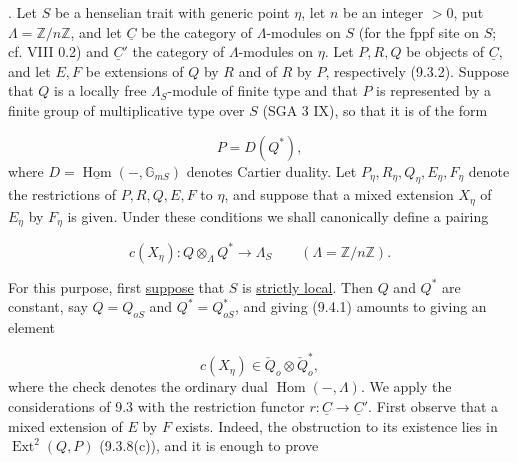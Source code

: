 
\medskip
{}. Let $S$ be a henselian trait with generic point $\eta$, let $n$ be an
integer $>0$, put $\Lambda=\mathbb Z/n\mathbb Z$, and let $\underline C$ be
the category of $\Lambda$-modules on $S$ (for the fppf site on $S$; cf.
VIII 0.2) and $\underline C'$ the category of $\Lambda$-modules on $\eta$.
Let $P,R,Q$ be objects of $\underline C$, and let $E,F$ be extensions of
$Q$ by $R$ and of $R$ by $P$, respectively (9.3.2). Suppose that $Q$ is a
locally free $\Lambda_S$-module of finite type and that $P$ is represented
by a finite group of multiplicative type over $S$ (SGA 3 IX), so that it is
of the form

\begin{equation*}
P=D(Q^*),
\end{equation*}
where $D=\underline{\operatorname{Hom}}(-,\mathbb G_{mS})$ denotes Cartier
duality. Let $P_\eta,R_\eta,Q_\eta,E_\eta,F_\eta$ denote the restrictions of
$P,R,Q,E,F$ to $\eta$, and suppose that a mixed extension $X_\eta$ of
$E_\eta$ by $F_\eta$ is given. Under these conditions we shall canonically
define a pairing

\begin{equation}\tag{9.4.1}
c(X_\eta):Q\otimes_\Lambda Q^*\longrightarrow\Lambda_S
\qquad(\Lambda=\mathbb Z/n\mathbb Z).
\end{equation}

For this purpose, first \underline{suppose} that $S$ is \underline{strictly local}. Then $Q$
and $Q^*$ are constant, say $Q=Q_{oS}$ and $Q^*=Q^*_{oS}$, and giving
(9.4.1) amounts to giving an element

\begin{equation}\tag{9.4.2}
c(X_\eta)\in\check Q_o\otimes\check Q_o^*,
\end{equation}
where the check denotes the ordinary dual $\operatorname{Hom}(-,\Lambda)$.
We apply the considerations of 9.3 with the restriction functor
$r:\underline C\longrightarrow\underline C'$. First observe that a mixed
extension of $E$ by $F$ exists. Indeed, the obstruction to its existence
lies in $\operatorname{Ext}^2(Q,P)$ (9.3.8(c)), and it is enough to prove

